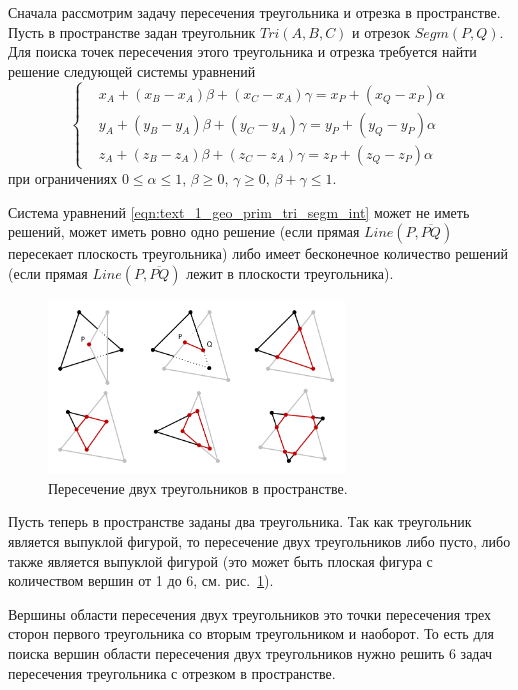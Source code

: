 Сначала рассмотрим задачу пересечения треугольника и отрезка в пространстве.
Пусть в пространстве задан треугольник $Tri(A, B, C)$ и отрезок $Segm(P, Q)$.
Для поиска точек пересечения этого треугольника и отрезка требуется найти решение следующей системы уравнений
\begin{equation}\label{eqn:text_1_geo_prim_tri_segm_int}
	\left\{
		\begin{aligned}
			& x_A + (x_B - x_A) \beta + (x_C - x_A) \gamma = x_P + (x_Q - x_P) \alpha \\
			& y_A + (y_B - y_A) \beta + (y_C - y_A) \gamma = y_P + (y_Q - y_P) \alpha \\
			& z_A + (z_B - z_A) \beta + (z_C - z_A) \gamma = z_P + (z_Q - z_P) \alpha
		\end{aligned}
	\right.
\end{equation}
при ограничениях $0 \le \alpha \le 1$, $\beta \ge 0$, $\gamma \ge 0$, $\beta + \gamma \le 1$.

Система уравнений \eqref{eqn:text_1_geo_prim_tri_segm_int} может не иметь решений, может иметь ровно одно решение (если прямая $Line(P, \overline{PQ})$ пересекает плоскость треугольника) либо имеет бесконечное количество решений (если прямая $Line(P, \overline{PQ})$ лежит в плоскости треугольника).

\begin{figure}[ht]
\centering
\includegraphics[width=0.7\textwidth]{fig/int_tri_tri.pdf}
\singlespacing
{}\caption{Пересечение двух треугольников в пространстве.}
\label{fig:text_1_geo_prim_tri_tri}
\end{figure}

Пусть теперь в пространстве заданы два треугольника.
Так как треугольник является выпуклой фигурой, то пересечение двух треугольников либо пусто, либо также является выпуклой фигурой (это может быть плоская фигура с количеством вершин от 1 до 6, см. рис.~\ref{fig:text_1_geo_prim_tri_tri}).

Вершины области пересечения двух треугольников это точки пересечения трех сторон первого треугольника со вторым треугольником и наоборот.
То есть для поиска вершин области пересечения двух треугольников нужно решить 6 задач пересечения треугольника с отрезком в пространстве.

